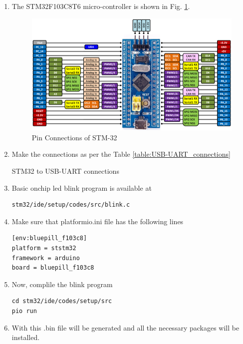 \begin{enumerate}[label=\arabic*.,ref=\theenumi]
\item The STM32F103C8T6 micro-controller is shown  in Fig. \ref{fig:stm_blue}. 
%
\begin{figure}[!htb]
\begin{center}
\includegraphics[width=\columnwidth]{stm32/sevenseg/figs/stm_blue}
\end{center}
\caption{Pin Connections of STM-32}
\label{fig:stm_blue}
\end{figure}
\item Make the connections as per the Table \ref{table:USB-UART_connections}
\begin{table}[!h]
\centering

\caption{STM32 to USB-UART connections}
\label{table:USB-UART_connections}
\end{table}
\item Basic onchip led blink program is available at 
\begin{lstlisting}
stm32/ide/setup/codes/src/blink.c
\end{lstlisting}
\item Make sure that platformio.ini file has the following lines
\begin{lstlisting}
[env:bluepill_f103c8]
platform = ststm32
framework = arduino
board = bluepill_f103c8
\end{lstlisting}
\item Now, complile the blink program
\begin{lstlisting}
cd stm32/ide/codes/setup/src
pio run
\end{lstlisting}
\item With this .bin file will be generated and all the necessary packages will be installed.

\end{enumerate}
